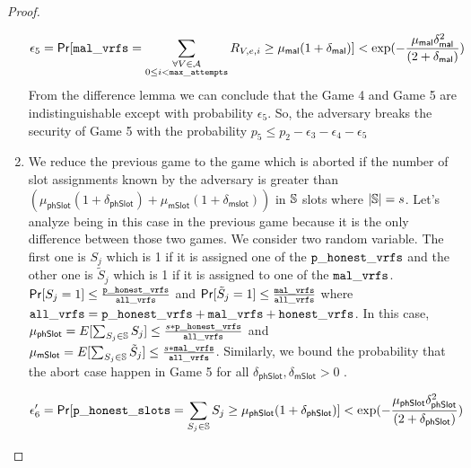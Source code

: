 \begin{proof}
\begin{enumerate}[label={{Game }}{{\arabic*}}]
	\begin{equation}\label{eq:malvrf}
	\epsilon_5 = \mathsf{Pr}[ \mathtt{mal\_vrfs} = \sum_{\substack{ \forall V \in \mathcal{A} \\0\leq i < \mathtt{max\_attempts}}} R_{V,e,i} \geq \mu_{\mathsf{mal}} (1+ \delta_{\mathsf{mal}})] < \exp(-\frac{\mu_{\mathsf{mal}}\delta_{\mathsf{mal}}^2}{(2+\delta_{\mathsf{mal}})}) \nonumber
	\end{equation}                                                                                                                                                                                                          From the difference lemma we can conclude that the Game 4 and Game 5 are indistinguishable except with probability $ \epsilon_5 $. So, the adversary breaks the security of Game 5 with the probability $ p_5 \leq p_2 - \epsilon_3  - \epsilon_4 - \epsilon_5$                                                         
	

	
	
	\item We reduce the previous game to the game which is aborted if the number of slot assignments known by the adversary is greater than $ (\mu_{\mathsf{phSlot}}(1+\delta_{\mathsf{phSlot}})+ \mu_{\mathsf{mSlot}}(1+\delta_{\mathsf{mslot}})) $ in $ \mathbb{S} $ slots where $ |\mathbb{S}| = s $. Let's analyze being in this case in the previous game because it is the only difference between those two games. We consider two random variable. The first one is $ S_{j} $ which is 1 if it is assigned one of the $ \mathtt{p\_honest\_vrfs} $ and the other one is $ \tilde{S}_j $ which is 1 if it is assigned to one of the $ \mathtt{mal\_vrfs} $. $ \mathsf{Pr}[S_j = 1] \leq \frac{\mathtt{p\_honest\_vrfs}}{\mathtt{all\_vrfs}} $ and $  \mathsf{Pr}[\tilde{S}_j = 1]\leq \frac{\mathtt{mal\_vrfs}}{\mathtt{all\_vrfs}} $ where $ \mathtt{all\_vrfs} = \mathtt{p\_honest\_vrfs} + \mathtt{mal\_vrfs} + \mathtt{honest\_vrfs} $. In this case, $ \mu_{\mathsf{phSlot}} = E[\sum_{S_j \in \mathbb{S}} S_j] \leq \frac{s*\mathtt{p\_honest\_vrfs}}{\mathtt{all\_vrfs}}$ and $ \mu_{\mathsf{mSlot}} = E[\sum_{S_j \in \mathbb{S}} \tilde{S}_j] \leq \frac{s*\mathtt{mal\_vrfs}}{\mathtt{all\_vrfs}}$. Similarly, we bound the probability that the abort case happen in Game 5 for all $ \delta_{\mathsf{phSlot}}, \delta_{\mathsf{mSlot}} > 0 $ .
	
	\begin{equation}\label{eq:malvrf}
	\epsilon'_6 = \mathsf{Pr}[\mathtt{p\_honest\_slots} = \sum_{S_j \in \mathbb{S}} S_{j} \geq \mu_{\mathsf{phSlot}} (1+ \delta_{\mathsf{phSlot}})] < \exp(-\frac{\mu_{\mathsf{phSlot}}\delta_{\mathsf{phSlot}}^2}{(2+\delta_{\mathsf{phSlot}})}) \nonumber
	\end{equation}      
	

\end{enumerate}
\end{proof}
